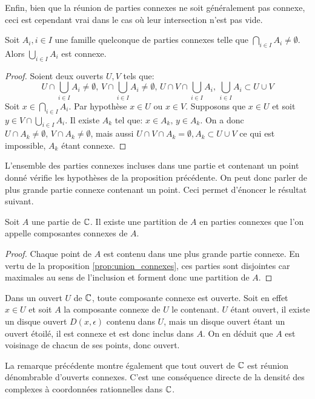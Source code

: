 Enfin, bien que la réunion de parties connexes ne soit généralement pas connexe, ceci est cependant vrai dans le cas où leur intersection n'est pas vide.
\begin{fprop}
\label{prop:union_connexes}
Soit $A_i, i \in I$ une famille quelconque de parties connexes telle que $\bigcap_{i \in I} A _i \neq \emptyset$. Alors $\bigcup_{i \in I} A_i$ est connexe.
\end{fprop}
\begin{proof}
Soient deux ouverts $U,V$ tels que:
\[
U \cap \bigcup_{i \in I} A_i \neq \emptyset, \, V \cap \bigcup_{i \in I} A_i \neq \emptyset, \, U \cap V \cap \bigcup_{i \in I} A_i , \, \bigcup_{i \in I} A_i \subset U \cup V
\]
Soit $x \in \bigcap_{i \in I} A_i$. Par hypothèse $x \in U$ ou $x \in V$. Supposons que $x \in U$ et soit $y \in V \cap \bigcup_{i \in I} A_i $. Il existe $A_k$ tel que: $x \in A_k, \, y \in A_k$. On a donc $U \cap A_k \neq \emptyset, \, V \cap A_k \neq \emptyset$, mais aussi $U \cap V \cap A_k = \emptyset, A_k \subset U \cup V$ ce qui est impossible, $A_k$ étant connexe.
\end{proof}
L'ensemble des parties connexes incluses dans une partie et contenant un point donné vérifie les hypothèses de la proposition précédente. On peut donc parler de plus grande partie connexe contenant un point. Ceci permet d'énoncer le résultat suivant.
\begin{fprop}
Soit $A$ une partie de $\mathbb{C}$. Il existe une partition de $A$ en parties connexes que l'on appelle composantes connexes de $A$.
\end{fprop}
\begin{proof}
Chaque point de $A$ est contenu dans une plus grande partie connexe. En vertu de la proposition \ref{prop:union_connexes}, ces parties sont disjointes car maximales au sens de l'inclusion et forment donc une partition de $A$.
\end{proof}
\begin{rem}
Dans un ouvert $U$ de $\mathbb{C}$, toute composante connexe est ouverte. Soit en effet $x \in U$ et soit $A$ la composante connexe de $U$ le contenant. $U$ étant ouvert, il existe un disque ouvert $D(x,\epsilon)$ contenu dans $U$, mais un disque ouvert étant un ouvert étoilé, il est connexe et est donc inclus dans $A$. On en déduit que $A$ est voisinage de chacun de ses points, donc ouvert.
\end{rem}
\begin{rem}
La remarque précédente montre également que tout ouvert de $\mathbb{C}$ est réunion dénombrable d'ouverts connexes. C'est une conséquence directe de la densité des complexes à coordonnées rationnelles dans $\mathbb{C}$. 
\end{rem}
